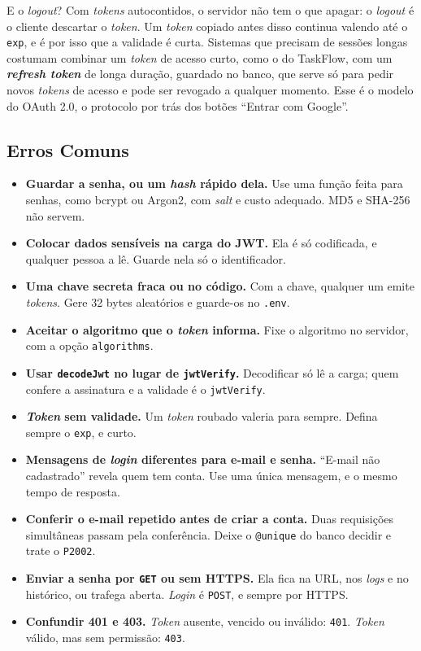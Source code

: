 E o \textit{logout}? Com \textit{tokens} autocontidos, o servidor não tem o que apagar: o \textit{logout} é o cliente descartar o \textit{token}. Um \textit{token} copiado antes disso continua valendo até o \texttt{exp}, e é por isso que a validade é curta. Sistemas que precisam de sessões longas costumam combinar um \textit{token} de acesso curto, como o do TaskFlow, com um \textbf{\textit{refresh token}} de longa duração, guardado no banco, que serve só para pedir novos \textit{tokens} de acesso e pode ser revogado a qualquer momento. Esse é o modelo do OAuth 2.0, o protocolo por trás dos botões ``Entrar com Google''.

\subsection{Erros Comuns}

\begin{itemize}
  \item \textbf{Guardar a senha, ou um \textit{hash} rápido dela.} Use uma função feita para senhas, como bcrypt ou Argon2, com \textit{salt} e custo adequado. MD5 e SHA-256 não servem.
  \item \textbf{Colocar dados sensíveis na carga do JWT.} Ela é só codificada, e qualquer pessoa a lê. Guarde nela só o identificador.
  \item \textbf{Uma chave secreta fraca ou no código.} Com a chave, qualquer um emite \textit{tokens}. Gere 32 bytes aleatórios e guarde-os no \texttt{.env}.
  \item \textbf{Aceitar o algoritmo que o \textit{token} informa.} Fixe o algoritmo no servidor, com a opção \texttt{algorithms}.
  \item \textbf{Usar \texttt{decodeJwt} no lugar de \texttt{jwtVerify}.} Decodificar só lê a carga; quem confere a assinatura e a validade é o \texttt{jwtVerify}.
  \item \textbf{\textit{Token} sem validade.} Um \textit{token} roubado valeria para sempre. Defina sempre o \texttt{exp}, e curto.
  \item \textbf{Mensagens de \textit{login} diferentes para e-mail e senha.} ``E-mail não cadastrado'' revela quem tem conta. Use uma única mensagem, e o mesmo tempo de resposta.
  \item \textbf{Conferir o e-mail repetido antes de criar a conta.} Duas requisições simultâneas passam pela conferência. Deixe o \texttt{@unique} do banco decidir e trate o \texttt{P2002}.
  \item \textbf{Enviar a senha por \texttt{GET} ou sem HTTPS.} Ela fica na URL, nos \textit{logs} e no histórico, ou trafega aberta. \textit{Login} é \texttt{POST}, e sempre por HTTPS.
  \item \textbf{Confundir 401 e 403.} \textit{Token} ausente, vencido ou inválido: \texttt{401}. \textit{Token} válido, mas sem permissão: \texttt{403}.
\end{itemize}
